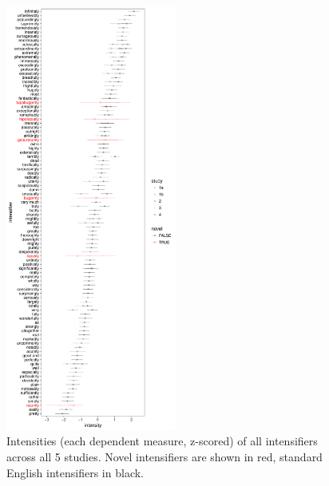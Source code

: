 \begin{appendices}

\begin{figure}[hbt]
\begin{center}
\includegraphics[width=0.5\textwidth]{images/intensities.pdf}
\end{center}
\caption{Intensities (each dependent measure, z-scored) of all intensifiers across all 5 studies. Novel intensifiers are shown in red, standard English intensifiers in black.}
\label{fig:intensities}
\end{figure}

\end{appendices}
